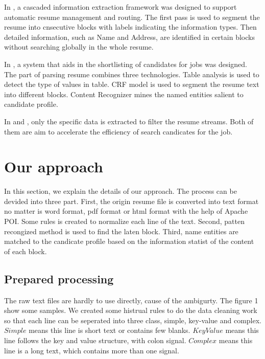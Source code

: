 \documentclass{acm_proc_article-sp}
\begin{document}
In \cite{Yu:2005:RIE:1219840.1219902}, a cascaded information extraction framework was designed to support automatic resume management and routing.
The first pass is used to segment the resume into cnsecutive blocks with labels indicating the information types. 
Then detailed information, such as Name and Address, are identified in certain blocks without searching globally in the whole resume.

In \cite{Singh:2010:PSS:1871437.1871523}, a system that aids in the shortlisting of candidates for jobs was designed. 
The part of parsing resume combines three technologies. 
Table analysis is used to detect the type of values in table. 
CRF model is used to segment the resume text into different blocks. 
Content Recognizer mines the named entities salient to candidate profile.

In \cite{kopparapu2010automatic} and \cite{maheshwari2010approach}, only the specific data is extracted to filter the resume streams. 
Both of them are aim to accelerate the efficiency of search candicates for the job.

\section{Our approach}

In this section, we explain the details of our approach. 
The process can be devided into three part. 
First, the origin resume file is converted into text format no matter is word format, pdf format or html format with the help of Apache POI. 
Some rules is created to normalize each line of the text. 
Second, patten recongized method is used to find the laten block. 
Third, name entities are matched to the candicate profile based on the information statist of the content of each block. 

\subsection{Prepared processing}

The raw text files are hardly to use directly, cause of the ambigurty. 
The figure 1 show some samples. 
We created some histrual rules to do the data cleaning work so that each line can be seperated into three class, simple, key-value and complex.
$Simple$ means this line is short text or contains few blanks. 
$KeyValue$ means this line follows the key and value structure, with colon signal.
$Complex$ means this line is a long text, which contains more than one signal.
\end{document}
